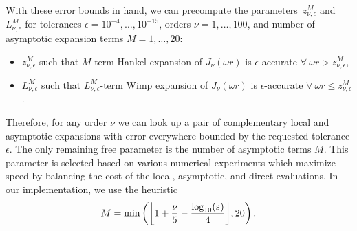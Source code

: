 With these error bounds in hand, we can precompute the
parameters~$z_{\nu, \epsilon}^M$ and~$L_{\nu, \epsilon}^M$ for tolerances
$\epsilon = 10^{-4}, \dots, \allowbreak 10^{-15}$, orders $\nu = 1, \dots, 100$,
and number of asymptotic expansion terms $M = 1, \dots, 20$:
\begin{itemize}
    \item $z_{\nu, \epsilon}^M$ such that $M$-term Hankel expansion of
    $J_\nu(\omega r)$ is $\epsilon$-accurate $\forall \ \omega r > z_{\nu,
    \epsilon}^M$,
    \item $L_{\nu, \epsilon}^M$ such that $L_{\nu, \epsilon}^M$-term Wimp
    expansion of $J_\nu(\omega r)$ is $\epsilon$-accurate $\forall \ \omega r
    \leq z_{\nu, \epsilon}^M$.
\end{itemize}
Therefore, for any order $\nu$ we can look up a pair of complementary local and
asymptotic expansions with error everywhere bounded by the requested tolerance
$\epsilon$. The only remaining free parameter is the number of asymptotic terms
$M$. This parameter is selected based on various numerical experiments which
maximize speed by balancing the cost of the local, asymptotic, and direct
evaluations. In our implementation, we use the heuristic
\begin{equation}
  \label{eq:num-asy-terms}
    M = \min\left(\flr{1 + \frac{\nu}{5} - \frac{\log_{10}(\epsilon)}{4}}, 20\right).
\end{equation}




